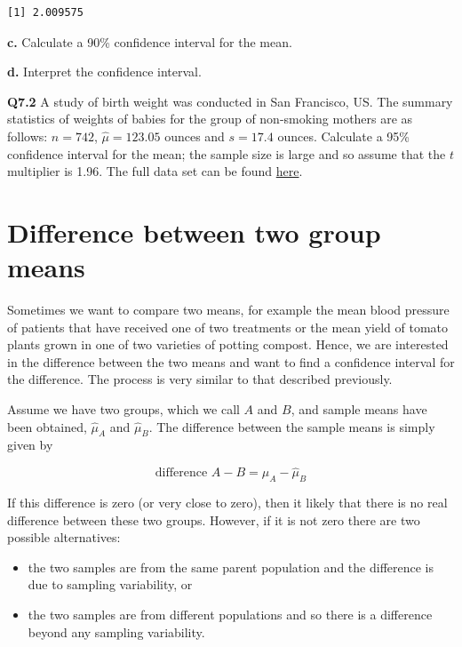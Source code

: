 \documentclass[
  oneside]{krantz}
\providecommand{\tightlist}{%
  \setlength{\itemsep}{0pt}\setlength{\parskip}{0pt}}
\begin{document}
\begin{verbatim}
[1] 2.009575
\end{verbatim}

\textbf{c.} Calculate a 90\% confidence interval for the mean.

\textbf{d.} Interpret the confidence interval.

\textbf{Q7.2} A study of birth weight was conducted in San Francisco, US. The summary statistics of weights of babies for the group of non-smoking mothers are as follows: \(n=742\), \(\hat \mu = 123.05\) ounces and \(s = 17.4\) ounces. Calculate a 95\% confidence interval for the mean; the sample size is large and so assume that the \(t\) multiplier is 1.96. The full data set can be found \href{https://www.stat.berkeley.edu/users/statlabs/labs.html}{here}.

\hypertarget{difference-between-two-group-means}{%
\section{Difference between two group means}\label{difference-between-two-group-means}}

Sometimes we want to compare two means, for example the mean blood pressure of patients that have received one of two treatments or the mean yield of tomato plants grown in one of two varieties of potting compost. Hence, we are interested in the difference between the two means and want to find a confidence interval for the difference. The process is very similar to that described previously.

Assume we have two groups, which we call \(A\) and \(B\), and sample means have been obtained, \(\hat \mu_A\) and \(\hat \mu_B\). The difference between the sample means is simply given by

\[\textrm{difference } A - B = \hat \mu_A - \hat \mu_B\]

If this difference is zero (or very close to zero), then it likely that there is no real difference between these two groups. However, if it is not zero there are two possible alternatives:

\begin{itemize}
\tightlist
\item
  the two samples are from the same parent population and the difference is due to sampling variability, or
\item
  the two samples are from different populations and so there is a difference beyond any sampling variability.
\end{itemize}
\end{document}
